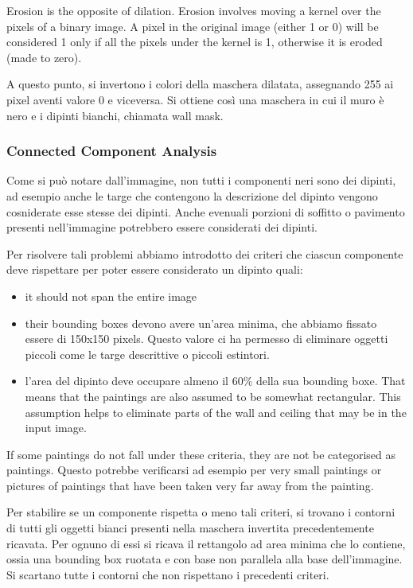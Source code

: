 \documentclass[10pt,twocolumn,letterpaper]{article}
\begin{document}
Erosion is the opposite of dilation. Erosion involves moving a kernel over the pixels of a binary image. A pixel in the original image (either 1 or 0) will be considered 1 only if all the pixels under the kernel is 1, otherwise it is eroded (made to zero).

A questo punto, si invertono i colori della maschera dilatata, assegnando 255 ai pixel aventi valore 0 e viceversa. Si ottiene così una maschera in cui il muro è nero e i dipinti bianchi, chiamata wall mask.

\subsubsection{Connected Component Analysis}

Come si può notare dall'immagine, non tutti i componenti neri sono dei dipinti, ad esempio anche le targe che contengono la descrizione del dipinto vengono cosniderate esse stesse dei dipinti. Anche evenuali porzioni di soffitto o pavimento presenti nell'immagine potrebbero essere considerati dei dipinti. 

Per risolvere tali problemi abbiamo introdotto dei criteri che ciascun componente deve rispettare per poter essere considerato un dipinto quali:
\begin{itemize}
   \item it should not span the entire image
   \item their bounding boxes devono avere un'area minima, che abbiamo fissato essere di 150x150 pixels. Questo valore ci ha permesso di eliminare oggetti piccoli come le targe descrittive o piccoli estintori.
   \item l'area del dipinto deve occupare almeno il 60\% della sua bounding boxe. That means that the paintings are also assumed to be somewhat rectangular. This assumption helps to eliminate parts of the wall and ceiling that may be in the input image.
\end{itemize}

If some paintings do not fall under these criteria, they are not be categorised as paintings. Questo potrebbe verificarsi ad esempio per very small paintings or pictures of paintings that have been taken very far away from the painting.

Per stabilire se un componente rispetta o meno tali criteri, si trovano i contorni di tutti gli oggetti bianci presenti nella maschera invertita precedentemente ricavata. Per ognuno di essi si ricava il rettangolo ad area minima che lo contiene, ossia una bounding box ruotata e con base non parallela alla base dell'immagine. Si scartano tutte i contorni che non rispettano i precedenti criteri.
\end{document}
